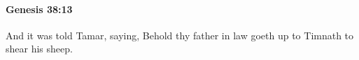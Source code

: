 
		\paragraph{Genesis 38:13} %
			\label{GENESIS-38-13}

			And it was told Tamar, saying, Behold thy father in law goeth up to Timnath to shear his sheep.


